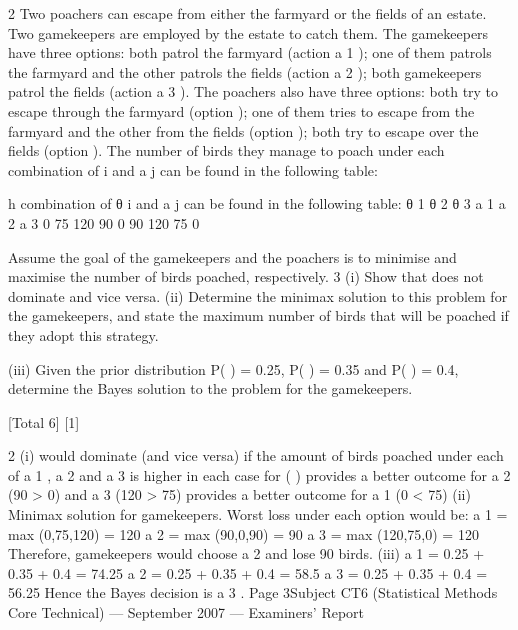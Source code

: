 \documentclass[a4paper,12pt]{article}
\begin{document}
2
Two poachers can escape from either the farmyard or the fields of an estate. Two
gamekeepers are employed by the estate to catch them. The gamekeepers have three
options: both patrol the farmyard (action a 1 ); one of them patrols the farmyard and the
other patrols the fields (action a 2 ); both gamekeepers patrol the fields (action a 3 ). The
poachers also have three options: both try to escape through the farmyard (option  );
one of them tries to escape from the farmyard and the other from the fields (option
 ); both try to escape over the fields (option  ). The number of birds they manage
to poach under each combination of \theta i and a j can be found in the following table:

h combination of θ i and a j can be found in the following table:
θ 1
θ 2
θ 3
a 1 a 2 a 3
0
75
120 90
0
90 120
75
0

Assume the goal of the gamekeepers and the poachers is to minimise and maximise
the number of birds poached, respectively.
3
(i) Show that  does not dominate  and vice versa.
(ii) Determine the minimax solution to this problem for the gamekeepers, and
state the maximum number of birds that will be poached if they adopt this
strategy.

(iii) Given the prior distribution P( ) = 0.25, P( ) = 0.35 and P( ) = 0.4,
determine the Bayes solution to the problem for the gamekeepers.

[Total 6]
[1]

2
(i)
 would dominate  (and vice versa) if the amount of birds poached under
each of a 1 , a 2 and a 3 is higher in each case for  ( )
 provides a better outcome for a 2 (90 > 0) and a 3 (120 > 75)
 provides a better outcome for a 1 (0 < 75)
(ii)
Minimax solution for gamekeepers. Worst loss under each option would be:
a 1 = max (0,75,120) = 120
a 2 = max (90,0,90) = 90
a 3 = max (120,75,0) = 120
Therefore, gamekeepers would choose a 2 and lose 90 birds.
(iii)
a 1 = 0.25  + 0.35  + 0.4  = 74.25
a 2 = 0.25  + 0.35  + 0.4  = 58.5
a 3 = 0.25  + 0.35  + 0.4  = 56.25
Hence the Bayes decision is a 3 .
Page 3Subject CT6 (Statistical Methods Core Technical) — September 2007 — Examiners’ Report
\end{document}
